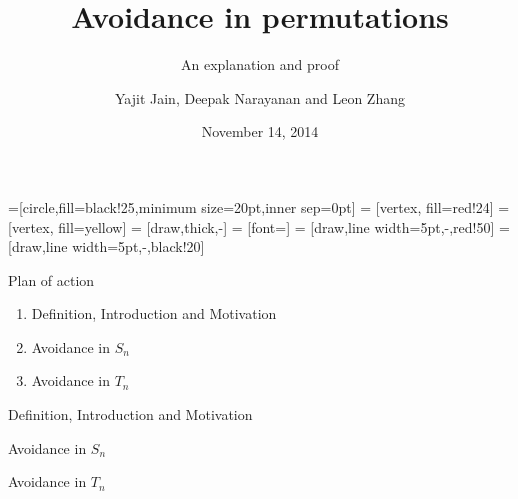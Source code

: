 \documentclass{beamer}
\title[Avoidance in permutations]{Avoidance in permutations}
\subtitle{An explanation and proof}
\author[Jain, Narayanan and Zhang]{Yajit Jain, Deepak Narayanan and Leon Zhang}
\date[November 2014]{November 14, 2014}
\begin{document}

=[circle,fill=black!25,minimum size=20pt,inner sep=0pt]
 = [vertex, fill=red!24]
 = [vertex, fill=yellow]
 = [draw,thick,-]
 = [font=\small]
 = [draw,line width=5pt,-,red!50]
 = [draw,line width=5pt,-,black!20]

\begin{frame}[plain]
  \titlepage
\end{frame}

\begin{frame}{Plan of action}
    \begin{enumerate}
        \item Definition, Introduction and Motivation
        \item Avoidance in $S_n$
        \item Avoidance in $T_n$
    \end{enumerate}
\end{frame}


\begin{frame}{Definition, Introduction and Motivation}

\end{frame}


\begin{frame}{Avoidance in $S_n$}

\end{frame}


\begin{frame}{Avoidance in $T_n$}

\end{frame}
\end{document}
